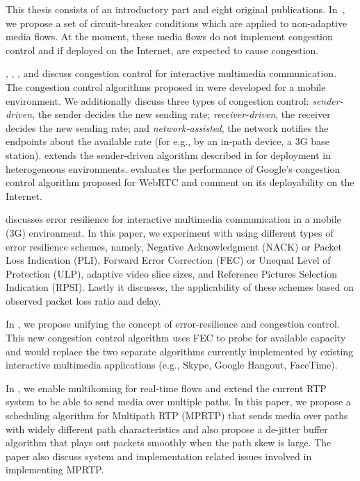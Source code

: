 This thesis consists of an introductory part and eight original publications.
In~, we propose a set of circuit-breaker conditions which are
applied to non-adaptive media flows. At the moment, these media flows do not
implement congestion control and if deployed on the Internet, are expected to
cause congestion.

, , , and 
discuss congestion control for interactive multimedia communication. The
congestion control algorithms proposed in  were developed for
a mobile environment. We additionally discuss three types of congestion
control:  \emph{sender-driven}, the sender decides the new sending rate; 
\emph{receiver-driven}, the receiver decides the new sending rate; and 
\emph{network-assisted}, the network notifies the endpoints about the available
rate (for e.g., by an in-path device, a 3G base station). 
extends the sender-driven algorithm described in  for
deployment in heterogeneous environments.  evaluates the
performance of Google's congestion control algorithm proposed for WebRTC and
comment on its deployability on the Internet.

 discusses error resilience for interactive multimedia
communication in a mobile (3G) environment. In this paper, we experiment with
using different types of error resilience schemes, namely, Negative
Acknowledgment (NACK) or Packet Loss Indication (PLI), Forward Error
Correction (FEC) or Unequal Level of Protection (ULP), adaptive video slice
sizes, and Reference Pictures Selection Indication (RPSI). Lastly it
discusses, the applicability of these schemes based on observed packet loss
ratio and delay.

In , we propose unifying the concept of error-resilience and
congestion control. This new congestion control algorithm uses FEC to probe
for available capacity and would replace the two separate algorithms currently
implemented by existing interactive multimedia applications (e.g., Skype,
Google Hangout, FaceTime).


In , we enable multihoming for real-time flows and extend the
current RTP system to be able to send media over multiple paths. In this
paper, we propose a scheduling algorithm for Multipath RTP (MPRTP) that sends
media over paths with widely different path characteristics and also propose a
de-jitter buffer algorithm that plays out packets smoothly when the path skew
is large. The paper also discuss system and implementation related issues
involved in implementing MPRTP.

